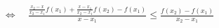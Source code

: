 \documentclass[preview]{standalone}
\begin{document}
\begin{align*}
& \Leftrightarrow\quad  \frac{\frac{x_2 - x}{x_2 - x_1}f(x_1) + \frac{x - x_1}{x_2 - x_1}f(x_2) - f(x_1)}{x - x_1} \leqslant \frac{f(x_2) - f(x_1)}{x_2 - x_1}
\end{align*}
\end{document}
